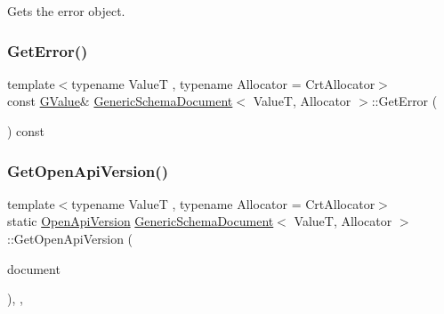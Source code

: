 Gets the error object. 

\mbox{\label{classGenericSchemaDocument_a03bdd7040e3aa840678d4fc05d3624c0}} 
\subsubsection{\texorpdfstring{Get\+Error()}{GetError()}\hspace{0.1cm}{\footnotesize\ttfamily [2/2]}}
{\footnotesize\ttfamily template$<$typename ValueT , typename Allocator  = Crt\+Allocator$>$ \\
const \hyperlink{classGenericSchemaDocument_a777505b09fff6cf23b8cfed9e0350eec}{G\+Value}\& \hyperlink{classGenericSchemaDocument}{Generic\+Schema\+Document}$<$ ValueT, Allocator $>$\+::Get\+Error (\begin{DoxyParamCaption}{ }\end{DoxyParamCaption}) const\hspace{0.3cm}{\ttfamily [inline]}}

\mbox{\label{classGenericSchemaDocument_ac4b3edcad9e8bbd5f6785778bddd8aa8}} 
\subsubsection{\texorpdfstring{Get\+Open\+Api\+Version()}{GetOpenApiVersion()}}
{\footnotesize\ttfamily template$<$typename ValueT , typename Allocator  = Crt\+Allocator$>$ \\
static \hyperlink{schema_8h_adb8b5aa4bb19e8e6920000a9ceebf0cd}{Open\+Api\+Version} \hyperlink{classGenericSchemaDocument}{Generic\+Schema\+Document}$<$ ValueT, Allocator $>$\+::Get\+Open\+Api\+Version (\begin{DoxyParamCaption}\item[{const \hyperlink{classGenericSchemaDocument_ae246f1b6573a5a8a2c0d73d4eb64d53a}{Value\+Type} \&}]{document }\end{DoxyParamCaption})\hspace{0.3cm}{\ttfamily [inline]}, {\ttfamily [static]}, {\ttfamily [private]}}

